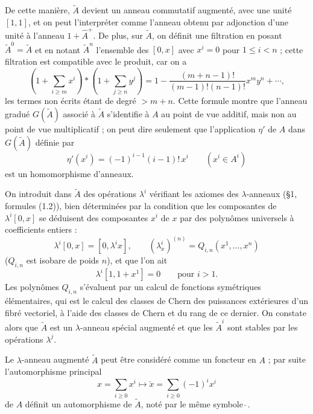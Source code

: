\documentclass[11pt]{article}
\providecommand{\Ahp}{\widehat A^{+}}
\begin{document}
De cette manière, $\widetilde A$ devient un anneau commutatif augmenté, avec une unité $[1,1]$, et on peut l'interpréter comme l'anneau obtenu par adjonction d'une unité à l'anneau $1+\Ahp$. De plus, sur $\widetilde A$, on définit une filtration en posant $\widetilde A^0=\widetilde A$ et en notant $\widetilde A^n$ l'ensemble des $[0,x]$ avec $x^i=0$ pour $1\leq i<n$ ; cette filtration est compatible avec le produit, car on a
\begin{equation}\tag{1.18}
\left(1+\sum_{i\geq m}x^i\right)*\left(1+\sum_{j\geq n}y^j\right)
=1-\frac{(m+n-1)!}{(m-1)!(n-1)!}x^m y^n+\cdots,
\end{equation}
les termes non écrits étant de degré $>m+n$. Cette formule montre que l'anneau gradué $G(\widetilde A)$ associé à $\widetilde A$ s'identifie à $A$ au point de vue additif, mais non au point de vue multiplicatif ; on peut dire seulement que l'application $\eta'$ de $A$ dans $G(\widetilde A)$ définie par
\begin{equation}\tag{1.19}
\eta'(x^i)=(-1)^{i-1}(i-1)!\,x^i\qquad (x^i\in A^i)
\end{equation}
est un homomorphisme d'anneaux.

On introduit dans $\widetilde A$ des opérations $\lambda^i$ vérifiant les axiomes des $\lambda$-anneaux (\S 1, formules (1.2)), bien déterminées par la condition que les composantes de $\lambda^i[0,x]$ se déduisent des composantes $x^i$ de $x$ par des polynômes universels à coefficients entiers :
\begin{equation}\tag{1.20}
\lambda^i[0,x]=[0,\lambda^i x],\qquad (\lambda^i_x)^{(n)}=Q_{i,n}(x^1,\ldots,x^n)
\end{equation}
($Q_{i,n}$ est isobare de poids $n$), et que l'on ait
\begin{equation}\tag{1.21}
\lambda^i[1,1+x^1]=0\qquad\text{pour }i>1.
\end{equation}
Les polynômes $Q_{i,n}$ s'évaluent par un calcul de fonctions symétriques élémentaires, qui est le calcul des classes de Chern des puissances extérieures d'un fibré vectoriel, à l'aide des classes de Chern et du rang de ce dernier. On constate alors que $\widetilde A$ est un $\lambda$-anneau spécial augmenté et que les $\widetilde A^i$ sont stables par les opérations $\lambda^j$.

Le $\lambda$-anneau augmenté $\widetilde A$ peut être considéré comme un foncteur en $A$ ; par suite l'automorphisme principal
\[
x=\sum_{i\geq0}x^i\longmapsto \check x=\sum_{i\geq0}(-1)^i x^i
\]
de $A$ définit un automorphisme de $\widetilde A$, noté par le même symbole $\check{\ }$.
\end{document}
